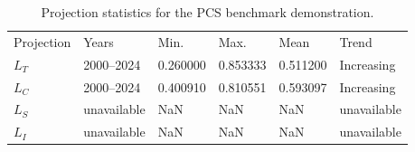 \begin{table}[tb]
\caption{\label{tab:projection_statistics}Projection statistics for the PCS benchmark demonstration.}
\footnotesize
\begin{ruledtabular}
\begin{tabular}{llllll}
Projection & Years & Min. & Max. & Mean & Trend \\
\(L_T\) & 2000--2024 & 0.260000 & 0.853333 & 0.511200 & Increasing \\
\(L_C\) & 2000--2024 & 0.400910 & 0.810551 & 0.593097 & Increasing \\
\(L_S\) & unavailable & NaN & NaN & NaN & unavailable \\
\(L_I\) & unavailable & NaN & NaN & NaN & unavailable \\
\end{tabular}
\end{ruledtabular}
\end{table}
